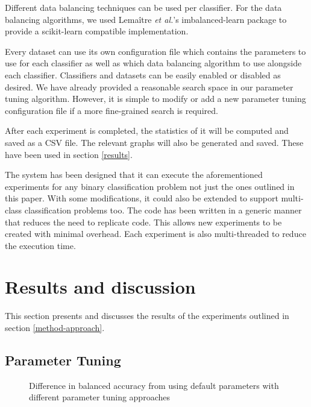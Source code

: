\documentclass{sig-alternate-05-2015}
\begin{document}
	Different data balancing techniques can be used per classifier. For the data balancing algorithms, we used Lema\^{i}tre \textit{et al.}'s \cite{lemaitre2016imbalanced} imbalanced-learn package to provide a scikit-learn compatible implementation.
	
	Every dataset can use its own configuration file which contains the parameters to use for each classifier as well as which data balancing algorithm to use alongside each classifier. Classifiers and datasets can be easily enabled or disabled as desired. We have already provided a reasonable search space in our parameter tuning algorithm. However, it is simple to modify or add a new parameter tuning configuration file if a more fine-grained search is required.
	
	After each experiment is completed, the statistics of it will be computed and saved as a CSV file. The relevant graphs will also be generated and saved. These have been used in section \ref{results}.
	
	The system has been designed that it can execute the aforementioned experiments for any binary classification problem not just the ones outlined in this paper. With some modifications, it could also be extended to support multi-class classification problems too. The code has been written in a generic manner that reduces the need to replicate code. This allows new experiments to be created with minimal overhead. Each experiment is also multi-threaded to reduce the execution time.
	
	\section{Results and discussion}
	This section presents and discusses the results of the experiments outlined in section \ref{method-approach}.
	\subsection{Parameter Tuning}
	
	
	\begin{figure}
		\centering
		\caption{Difference in balanced accuracy from using default parameters with different parameter tuning approaches}
		\label{fig:res}
	\end{figure}
\end{document}
